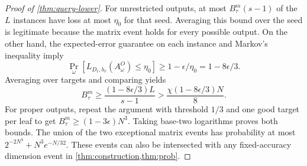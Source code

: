 \begin{proof}[Proof of \cref{thm:query-lower}]
For unrestricted outputs, at most $B_\tau^m(s-1)$ of the $L$ instances have loss at most $\eta_0$ for that seed. Averaging this bound over the seed is legitimate because the matrix event holds for every possible output. On the other hand, the expected-error guarantee on each instance and Markov's inequality imply
\[
 \Pr_\omega[L_{D_\ell,h_\ell}(A^O_\omega)\le\eta_0]
 \ge1-\epsilon/\eta_0=1-8\epsilon/3.
\]
Averaging over targets and comparing yields
\[
 B_\tau^m\ge
 \frac{(1-8\epsilon/3)L}{s-1}
 >\frac{\chi(1-8\epsilon/3)N}{8}.
\]
For proper outputs, repeat the argument with threshold $1/3$ and one good target per leaf to get $B_\tau^m\ge(1-3\epsilon)N^3$. Taking base-two logarithms proves both bounds. The union of the two exceptional matrix events has probability at most $2^{-2N^3}+N^3e^{-N/32}$. These events can also be intersected with any fixed-accuracy dimension event in \cref{thm:construction,thm:prob}.
\end{proof}
